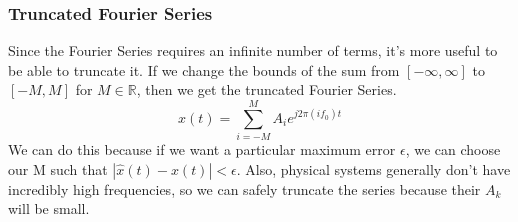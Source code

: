 \documentclass{article}
\begin{document}
\subsubsection{Truncated Fourier Series}
Since the Fourier Series requires an infinite number of terms, it's more useful to be able to truncate it.
If we change the bounds of the sum from $[-\infty, \infty]$ to $[-M, M]$ for $M\in\mathbb{R}$, then we get the truncated Fourier Series.
$$\hat{x}(t) = \sum_{i=-M}^{M}{A_i e^{j2\pi(if_0)t}}$$
We can do this because if we want a particular maximum error $\epsilon$, we can choose our M such that $|\hat{x}(t)-x(t)|<\epsilon$.
Also, physical systems generally don't have incredibly high frequencies, so we can safely truncate the series because their $A_k$ will be small.
\end{document}
